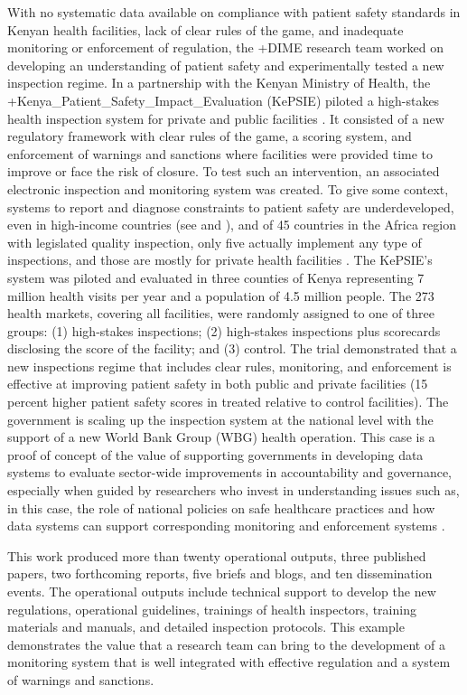 \documentclass[
]{WileySix}
\begin{document}
With no systematic data available on compliance with patient safety standards in Kenyan health facilities, lack of clear rules of the game, and inadequate monitoring or enforcement of regulation, the +DIME\textbar{} research team worked on developing an understanding of patient safety and experimentally tested a new inspection regime. In a partnership with the Kenyan Ministry of Health, the +Kenya\_Patient\_Safety\_Impact\_Evaluation\textbar{} (KePSIE) piloted a high-stakes health inspection system for private and public facilities \citep[see][]{bedoyaforthcoming}. It consisted of a new regulatory framework with clear rules of the game, a scoring system, and enforcement of warnings and sanctions where facilities were provided time to improve or face the risk of closure. To test such an intervention, an associated electronic inspection and monitoring system was created. To give some context, systems to report and diagnose constraints to patient safety are underdeveloped, even in high-income countries (see \citet{wachter2010} and \citet{longo2005}), and of 45 countries in the Africa region with legislated quality inspection, only five actually implement any type of inspections, and those are mostly for private health facilities \citep{spreng2011}. The KePSIE's system was piloted and evaluated in three counties of Kenya representing 7 million health visits per year and a population of 4.5 million people. The 273 health markets, covering all facilities, were randomly assigned to one of three groups: (1) high-stakes inspections; (2) high-stakes inspections plus scorecards disclosing the score of the facility; and (3) control. The trial demonstrated that a new inspections regime that includes clear rules, monitoring, and enforcement is effective at improving patient safety in both public and private facilities (15 percent higher patient safety scores in treated relative to control facilities). The government is scaling up the inspection system at the national level with the support of a new World Bank Group (WBG) health operation. This case is a proof of concept of the value of supporting governments in developing data systems to evaluate sector-wide improvements in accountability and governance, especially when guided by researchers who invest in understanding issues such as, in this case, the role of national policies on safe healthcare practices and how data systems can support corresponding monitoring and enforcement systems \citep{worldhealthorganizationregionalofficeforafrica2014}.

This work produced more than twenty operational outputs, three published papers, two forthcoming reports, five briefs and blogs, and ten dissemination events. The operational outputs include technical support to develop the new regulations, operational guidelines, trainings of health inspectors, training materials and manuals, and detailed inspection protocols. This example demonstrates the value that a research team can bring to the development of a monitoring system that is well integrated with effective regulation and a system of warnings and sanctions.
\end{document}
